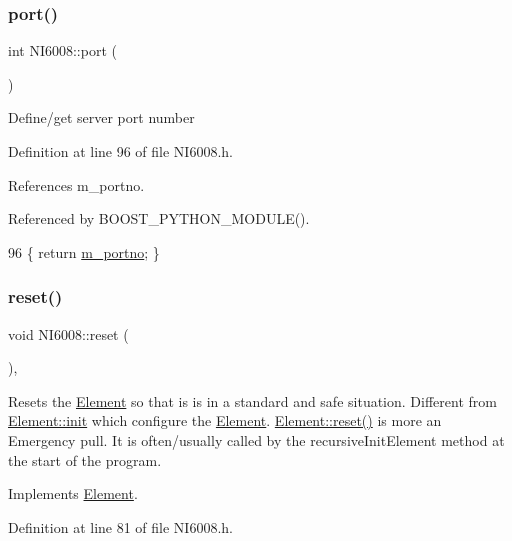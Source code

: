 \subsubsection{\texorpdfstring{port()}{port()}}
{\footnotesize\ttfamily int N\+I6008\+::port (\begin{DoxyParamCaption}{ }\end{DoxyParamCaption})\hspace{0.3cm}{\ttfamily [inline]}}

Define/get server port number 

Definition at line 96 of file N\+I6008.\+h.



References m\+\_\+portno.



Referenced by B\+O\+O\+S\+T\+\_\+\+P\+Y\+T\+H\+O\+N\+\_\+\+M\+O\+D\+U\+L\+E().


\begin{DoxyCode}
96 \{ \textcolor{keywordflow}{return} \hyperlink{classNI6008_aabb914d00c938a12e99c1078f40fb104}{m\_portno}; \} 
\end{DoxyCode}
\mbox{\label{classNI6008_a8fd2303c006beba3ceeeac3beb6aaa5e}} 
\subsubsection{\texorpdfstring{reset()}{reset()}}
{\footnotesize\ttfamily void N\+I6008\+::reset (\begin{DoxyParamCaption}{ }\end{DoxyParamCaption})\hspace{0.3cm}{\ttfamily [inline]}, {\ttfamily [virtual]}}

Resets the \hyperlink{classElement}{Element} so that is is in a standard and safe situation. Different from \hyperlink{classElement_af42754b5cabc198869222725218d695c}{Element\+::init} which configure the \hyperlink{classElement}{Element}. \hyperlink{classElement_a69efffa22f06909d768149715565cb56}{Element\+::reset()} is more an Emergency pull. It is often/usually called by the recursive\+Init\+Element method at the start of the program. 

Implements \hyperlink{classElement_a69efffa22f06909d768149715565cb56}{Element}.



Definition at line 81 of file N\+I6008.\+h.



